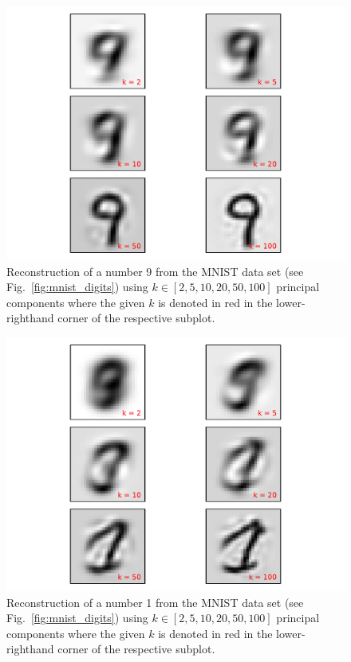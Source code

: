 \documentclass[12pt]{amsart}
\begin{document}
\begin{figure}[H]
	\includegraphics[width=\columnwidth]{9_recon_mnist.pdf}
    \caption{Reconstruction of a number 9 from the MNIST data set (see Fig.~\ref{fig:mnist_digits}) using $k \in [2,5,10,20,50,100]$ principal components where the given $k$ is denoted in red in the lower-righthand corner of the respective subplot.}
    \label{fig:recon_9}
\end{figure}

\begin{figure}[H]
	\includegraphics[width=\columnwidth]{1_recon_mnist.pdf}
    \caption{Reconstruction of a number 1 from the MNIST data set (see Fig.~\ref{fig:mnist_digits}) using $k \in [2,5,10,20,50,100]$ principal components where the given $k$ is denoted in red in the lower-righthand corner of the respective subplot.}
    \label{fig:recon_1}
\end{figure}
\end{document}
